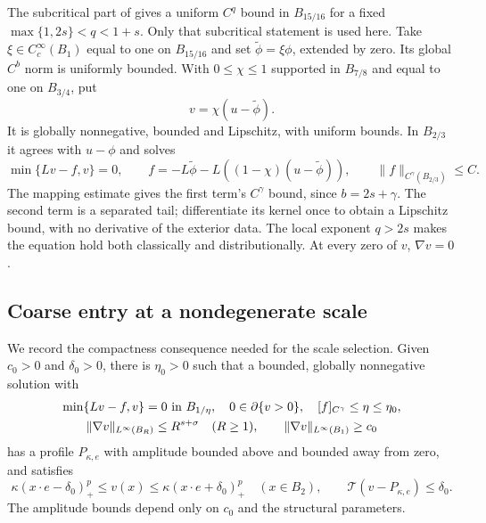 \documentclass[11pt]{article}
\numberwithin{equation}{section}
\newcommand{\T}{\mathcal T}
\begin{document}
The subcritical part of \cite[Corollary 1.3]{RTW} gives a uniform
$C^q$ bound in $B_{15/16}$ for a fixed
$\max\{1,2s\}<q<1+s$. Only that subcritical statement is used here.
Take $\xi\in C_c^\infty(B_1)$ equal to one on $B_{15/16}$ and set
$\widetilde\phi=\xi\phi$, extended by zero. Its global $C^b$ norm is
uniformly bounded. With $0\leq\chi\leq1$ supported in $B_{7/8}$ and equal
to one on $B_{3/4}$, put
\begin{equation}\label{eq:localized-v}
                         v=\chi(u-\widetilde\phi).
\end{equation}
It is globally nonnegative, bounded and Lipschitz, with uniform bounds.
In $B_{2/3}$ it agrees with $u-\phi$ and solves
\begin{equation}\label{eq:localized-equation}
 \min\{Lv-f,v\}=0,\qquad
 f=-L\widetilde\phi-L((1-\chi)(u-\widetilde\phi)),\qquad
                            \|f\|_{C^\gamma(B_{2/3})}\leq C.
\end{equation}
The mapping estimate \cite[Lemma 2.2.6]{FRRO} gives the first term's
$C^\gamma$ bound, since $b=2s+\gamma$. The second term is a separated tail;
differentiate its kernel once to obtain a Lipschitz bound, with no
derivative of the exterior data. The local exponent $q>2s$ makes the
equation hold both classically and distributionally. At every zero of $v$,
$\nabla v=0$.

\subsection{Coarse entry at a nondegenerate scale}

We record the compactness consequence needed for the scale selection.
Given $c_0>0$ and $\delta_0>0$, there is $\eta_0>0$ such that a bounded,
globally nonnegative solution with
\begin{gather}\label{eq:coarse-hypotheses}
 \min\{Lv-f,v\}=0\ \hbox{in }B_{1/\eta},\quad
 0\in\partial\{v>0\},\quad [f]_{C^\gamma}\leq\eta\leq\eta_0,\\
 \|\nabla v\|_{L^\infty(B_R)}\leq R^{s+\sigma}\quad(R\geq1),\qquad
                  \|\nabla v\|_{L^\infty(B_1)}\geq c_0\notag
\end{gather}
has a profile $P_{\kappa,e}$ with amplitude bounded above and bounded away
from zero, and satisfies
\begin{equation}\label{eq:coarse-sandwich}
 \kappa(x\cdot e-\delta_0)_+^p\leq v(x)
                    \leq\kappa(x\cdot e+\delta_0)_+^p\quad(x\in B_2),
 \qquad \T(v-P_{\kappa,e})\leq\delta_0.
\end{equation}
The amplitude bounds depend only on $c_0$ and the structural parameters.
\end{document}
